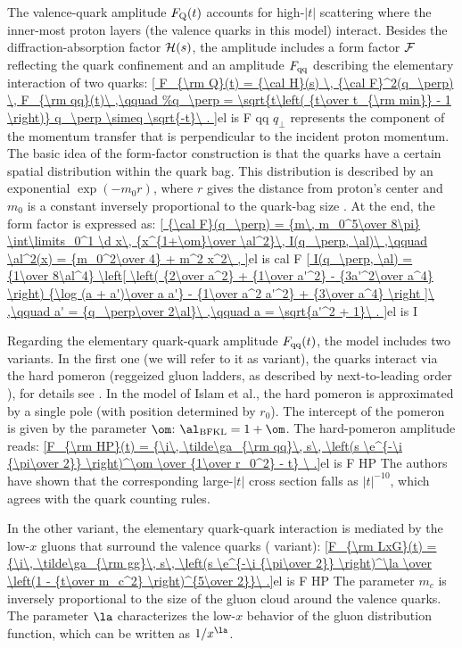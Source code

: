 The valence-quark amplitude $F_{\rm Q}(t)$ accounts for high-$|t|$ scattering where the inner-most proton layers (the valence quarks in this model) interact. Besides the diffraction-absorption factor ${\cal H}(s)$, the amplitude includes a form factor ${\cal F}$ reflecting the quark confinement and an amplitude $F_{\rm qq}$ describing the elementary interaction of two quarks:
\eqref{
	F_{\rm Q}(t) = {\cal H}(s) \, {\cal F}^2(q_\perp) \, F_{\rm qq}(t)\ ,\qquad
	q_\perp \simeq \sqrt{-t}\ .
}{el is F qq}
$q_\perp$ represents the component of the momentum transfer that is perpendicular to the incident proton momentum. The basic idea of the form-factor construction is that the quarks have a certain spatial distribution within the quark bag. This distribution is described by an exponential $\exp(- m_0 r)$, where $r$ gives the distance from proton's center and $m_0$ is a constant inversely proportional to the quark-bag size . At the end, the form factor is expressed as:
\eqref{
	{\cal F}(q_\perp) = {m\, m_0^5\over 8\pi} \int\limits_0^1 \d x\, {x^{1+\om}\over \al^2}\, I(q_\perp, \al)\ ,\qquad
	\al^2(x) = {m_0^2\over 4} + m^2 x^2\ ,
}{el is cal F}
\eqref{
	I(q_\perp, \al) = {1\over 8\al^4} \left[
		\left( {2\over a^2} + {1\over a'^2} - {3a'^2\over a^4} \right) {\log (a + a')\over a a'}
		- {1\over a^2 a'^2}
		+ {3\over a^4}
	\right ]\ ,\qquad
	a' = {q_\perp\over 2\al}\ ,\qquad
	a = \sqrt{a'^2 + 1}\ .
}{el is I}

Regarding the elementary quark-quark amplitude $F_{\rm qq}(t)$, the model includes two variants. In the first one (we will refer to it as  variant), the quarks interact via the hard pomeron (reggeized gluon ladders, as described by next-to-leading order ), for details see . In the model of Islam et al., the hard pomeron is approximated by a single pole (with position determined by $r_0$). The intercept of the pomeron is given by the parameter $\om$: $\al_{\rm BFKL} = 1 + \om$. The hard-pomeron amplitude reads:
\eqref{F_{\rm HP}(t) = {\i\, \tilde\ga_{\rm qq}\, s\, \left(s \e^{-\i {\pi\over 2}} \right)^\om \over {1\over r_0^2} - t} \ .}{el is F HP}
The authors have shown  that the corresponding large-$|t|$ cross section falls as $|t|^{-10}$, which agrees with the  quark counting rules.

In the other variant, the elementary quark-quark interaction is mediated by the low-$x$ gluons that surround the valence quarks  ( variant):
\eqref{F_{\rm LxG}(t) = {\i\, \tilde\ga_{\rm gg}\, s\, \left(s \e^{-\i {\pi\over 2}} \right)^\la \over \left(1 - {t\over m_c^2} \right)^{5\over 2}}\ .}{el is F HP}
The parameter $m_c$ is inversely proportional to the size of the gluon cloud around the valence quarks. The parameter $\la$ characterizes the low-$x$ behavior of the gluon distribution function, which can be written as $1/x^\la$.


